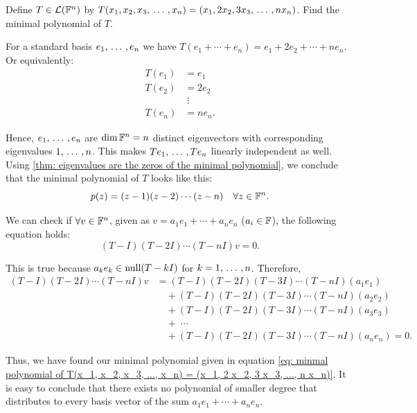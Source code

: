 \begin{xrcs}
  Define $T \in \mathcal{L}(\mathbb{F}^n)$ by $T(x_1, x_2, x_3, {\, \ldots \,\,}, x_n) = (x_1, 2 x_2, 3 x_3, {\, \ldots \,\,},  n x_n)$. Find the minimal polynomial of $T$.

  \begin{xsol}
    For a standard basis $e_1, {\, \ldots \,\,}, e_n$ we have $T( e_1 + \cdots + e_n) = e_1 + 2e_2 + \cdots + n e_n$. Or equivalently:
    \begin{equation}
      \begin{aligned}
        T(e_1) &= e_1  \\
        T(e_2) &= 2e_2 \\
               &\; \vdots \\
        T(e_n) &= n e_n.
      \end{aligned}
    \end{equation}

    Hence, $e_1, {\, \ldots \,\,}, e_n$ are $\dim \mathbb{F}^n = n$ distinct eigenvectors with corresponding eigenvalues $1, {\, \ldots \,\,}, n$. This makes $Te_1, {\, \ldots \,\,}, Te_n$ linearly independent as well. Using \ref{thm: eigenvalues are the zeros of the minimal polynomial}, we conclude that the minimal polynomial of $T$ looks like this:
    \begin{equation}
      \label{eq: minmal polynomial of T(x_1, x_2, x_3, ..., x_n) = (x_1, 2 x_2, 3 x_3, ...,  n x_n)}
      p(z) = (z-1)(z-2)\cdots(z-n) \quad \forall z \in \mathbb{F}^n.
    \end{equation}

    We can check if $\forall v \in \mathbb{F}^n$, given as $v = a_1 e_1 + \cdots + a_n e_n$ ($a_i \in \mathbb{F}$), the following equation holds:
    \begin{equation}
      (T-I)(T-2I)\cdots(T-nI)v=0.
    \end{equation}

    This is true because $a_k e_k \in \operatorname{null} (T-kI)$ for $k=1, {\, \ldots \,\,}, n$. Therefore,
    \begin{equation}
      \begin{aligned}
          (T-I)(T-2I)\cdots(T-nI)v & = (T-I)(T-2I)(T-3I)\cdots(T-nI)(a_1 e_1) \\
                                 & \quad + (T-I)(T-2I)(T-3I)\cdots(T-nI)(a_2 e_2) \\
                                 & \quad + (T-I)(T-2I)(T-3I)\cdots(T-nI)(a_3 e_3) \\
                                 & \quad + \; \cdots \\
                                 & \quad + (T-I)(T-2I)(T-3I)\cdots(T-nI)(a_n e_n) = 0.
      \end{aligned}
    \end{equation}

    Thus, we have found our minimal polynomial given in equation \eqref{eq: minmal polynomial of T(x_1, x_2, x_3, ..., x_n) = (x_1, 2 x_2, 3 x_3, ...,  n x_n)}. It is easy to conclude that there exists no polynomial of smaller degree that distributes to every basis vector of the sum $a_1 e_1 + \cdots + a_n e_n$.
  \end{xsol}
\end{xrcs}

